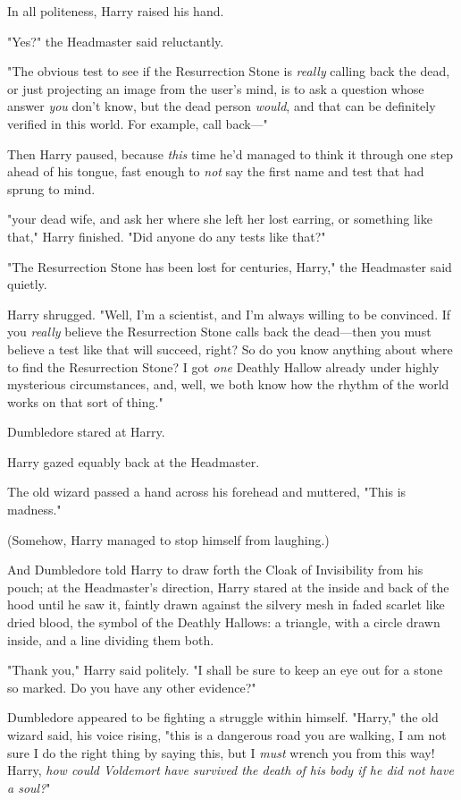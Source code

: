 In all politeness, Harry raised his hand.

"Yes?" the Headmaster said reluctantly.

"The obvious test to see if the Resurrection Stone is \emph{really} calling
back the dead, or just projecting an image from the user's mind, is to ask a
question whose answer \emph{you} don't know, but the dead person \emph{would},
and that can be definitely verified in this world. For example, call back—"

Then Harry paused, because \emph{this} time he'd managed to think it through
one step ahead of his tongue, fast enough to \emph{not} say the first name and
test that had sprung to mind.

"{\el}your dead wife, and ask her where she left her lost earring, or
something like that," Harry finished. "Did anyone do any tests like that?"

"The Resurrection Stone has been lost for centuries, Harry," the Headmaster
said quietly.

Harry shrugged. "Well, I'm a scientist, and I'm always willing to be convinced.
If you \emph{really} believe the Resurrection Stone calls back the dead—then
you must believe a test like that will succeed, right? So do you know anything
about where to find the Resurrection Stone? I got \emph{one} Deathly Hallow
already under highly mysterious circumstances, and, well, we both know how the
rhythm of the world works on that sort of thing."

Dumbledore stared at Harry.

Harry gazed equably back at the Headmaster.

The old wizard passed a hand across his forehead and muttered, "This is
madness."

(Somehow, Harry managed to stop himself from laughing.)

And Dumbledore told Harry to draw forth the Cloak of Invisibility from his
pouch; at the Headmaster's direction, Harry stared at the inside and back of
the hood until he saw it, faintly drawn against the silvery mesh in faded
scarlet like dried blood, the symbol of the Deathly Hallows: a triangle, with a
circle drawn inside, and a line dividing them both.

"Thank you," Harry said politely. "I shall be sure to keep an eye out for a
stone so marked. Do you have any other evidence?"

Dumbledore appeared to be fighting a struggle within himself. "Harry," the old
wizard said, his voice rising, "this is a dangerous road you are walking, I am
not sure I do the right thing by saying this, but I \emph{must} wrench you from
this way! Harry, \emph{how could Voldemort have survived the death of his body
if he did not have a soul?}"

